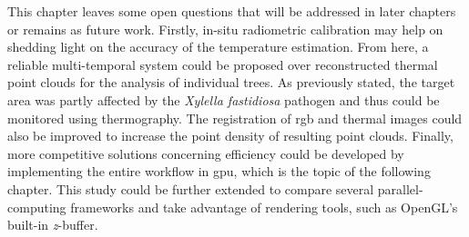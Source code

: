 This chapter leaves some open questions that will be addressed in later chapters or remains as future work. Firstly, in-situ radiometric calibration may help on shedding light on the accuracy of the temperature estimation. From here, a reliable multi-temporal system could be proposed over reconstructed thermal point clouds for the analysis of individual trees. As previously stated, the target area was partly affected by the \textit{Xylella fastidiosa} pathogen and thus could be monitored using thermography. The registration of \acrshort{rgb} and thermal images could also be improved to increase the point density of resulting point clouds. Finally, more competitive solutions concerning efficiency could be developed by implementing the entire workflow in \acrshort{gpu}, which is the topic of the following chapter. This study could be further extended to compare several parallel-computing frameworks and take advantage of rendering tools, such as OpenGL's built-in \textit{z}-buffer.